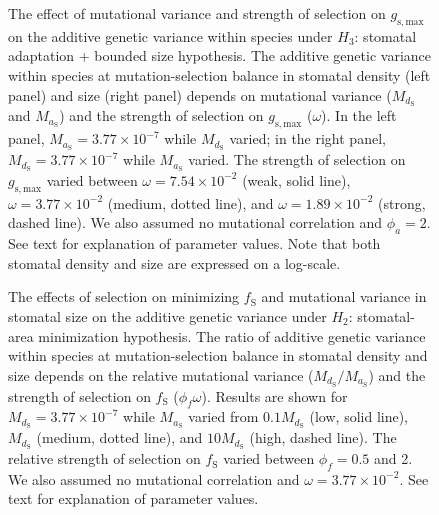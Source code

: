 \documentclass[
  letterpaper,
  DIV=11,
  numbers=noendperiod]{scrartcl}
\begin{document}
\begin{figure}
\caption{The effect of mutational variance and strength of selection on $g_\mathrm{s,max}$ on the additive genetic variance within species under $H_3$: stomatal adaptation + bounded size hypothesis. The additive genetic variance within species at mutation-selection balance in stomatal density (left panel) and size (right panel) depends on mutational variance ($M_{d_\mathrm{S}}$ and $M_{a_\mathrm{S}}$) and the strength of selection on $g_\mathrm{s,max}$ ($\omega$). In the left panel, $M_{a_\mathrm{S}} = 3.77 \times 10^{-7}$ while $M_{d_\mathrm{S}}$ varied; in the right panel, $M_{d_\mathrm{S}} = 3.77 \times 10^{-7}$ while $M_{a_\mathrm{S}}$ varied. The strength of selection on $g_\mathrm{s,max}$ varied between $\omega = 7.54 \times 10^{-2}$ (weak, solid line), $\omega = 3.77 \times 10^{-2}$ (medium, dotted line), and $\omega = 1.89 \times 10^{-2}$ (strong, dashed line). We also assumed no mutational correlation and $\phi_a = 2$. See text for explanation of parameter values. Note that both stomatal density and size are expressed on a log-scale.}

\end{figure}

\newpage

\begin{figure}
\caption{The effects of selection on minimizing $f_\mathrm{S}$ and mutational variance in stomatal size on the additive genetic variance under $H_2$: stomatal-area minimization hypothesis. The ratio of additive genetic variance within species at mutation-selection balance in stomatal density and size depends on the relative mutational variance ($M_{d_\mathrm{S}} / M_{a_\mathrm{S}}$) and the strength of selection on $f_\mathrm{S}$ ($\phi_f \omega$). Results are shown for $M_{d_\mathrm{S}} = 3.77 \times 10^{-7}$ while $M_{a_\mathrm{S}}$ varied from $0.1 M_{d_\mathrm{S}}$ (low, solid line), $M_{d_\mathrm{S}}$ (medium, dotted line), and $10 M_{d_\mathrm{S}}$ (high, dashed line). The relative strength of selection on $f_\mathrm{S}$ varied between $\phi_f = 0.5$ and 2. We also assumed no mutational correlation and $\omega = 3.77 \times 10^{-2}$. See text for explanation of parameter values.}

\end{figure}

\newpage
\end{document}
